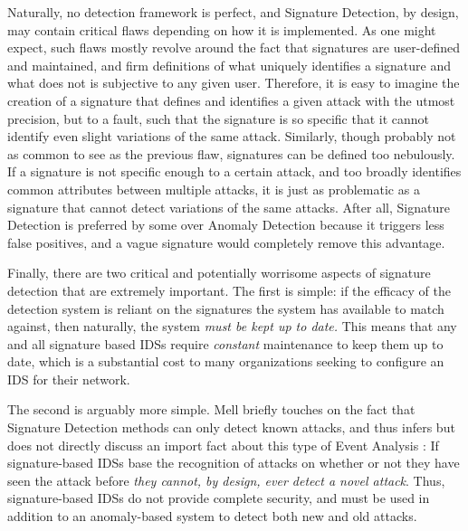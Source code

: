 \documentclass{acm_proc_article-sp}
\begin{document}
	    	Naturally, no detection framework is perfect, and Signature Detection, by design, may contain critical flaws depending on how it is implemented. As one might expect, such flaws mostly revolve around the fact that signatures are user-defined and maintained, and firm definitions of what uniquely identifies a signature and what does not is subjective to any given user. Therefore, it is easy to imagine the creation of a signature that defines and identifies a given attack with the utmost precision, but to a fault, such that the signature is so specific that it cannot identify even slight variations of the same attack. Similarly, though probably not as common to see as the previous flaw, signatures can be defined too nebulously. If a signature is not specific enough to a certain attack, and too broadly identifies common attributes between multiple attacks, it is just as problematic as a signature that cannot detect variations of the same attacks. After all, Signature Detection is preferred by some over Anomaly Detection because it triggers less false positives, and a vague signature would completely remove this advantage. 
	    	
	    	Finally, there are two critical and potentially worrisome aspects of signature detection that are extremely important. The first is simple: if the efficacy of the detection system is reliant on the signatures the system has available to match against, then naturally, the system \emph{must be kept up to date.} This means that any and all signature based IDSs require \emph{constant} maintenance to keep them up to date, which is a substantial cost to many organizations seeking to configure an IDS for their network.
	    	
	    	The second is arguably more simple. Mell briefly touches on the fact that Signature Detection methods can only detect known attacks, and thus infers but does not directly discuss an import fact about this type of Event Analysis \cite{Taylor2006}: If signature-based IDSs base the recognition of attacks on whether or not they have seen the attack before \emph{they cannot, by design, ever detect a novel attack}. Thus, signature-based IDSs do not provide complete security, and must be used in addition to an anomaly-based system to detect both new and old attacks.
\end{document}
